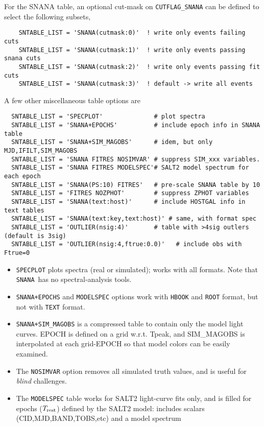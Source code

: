 \documentclass[12pt]{article}
\newcommand{\Trest}{T_{\rm rest}}
\newcommand{\snana}{{\tt SNANA}}
\begin{document}
{For the SNANA table, an optional cut-mask on {\tt CUTFLAG\_SNANA} can
be defined to select the following subsets,
\begin{verbatim}
    SNTABLE_LIST = 'SNANA(cutmask:0)'  ! write only events failing cuts
    SNTABLE_LIST = 'SNANA(cutmask:1)'  ! write only events passing snana cuts
    SNTABLE_LIST = 'SNANA(cutmask:2)'  ! write only events passing fit cuts
    SNTABLE_LIST = 'SNANA(cutmask:3)'  ! default -> write all events
\end{verbatim}


\clearpage
A few other miscellaneous table options are
%
\begin{verbatim}
  SNTABLE_LIST = 'SPECPLOT'              # plot spectra
  SNTABLE_LIST = 'SNANA+EPOCHS'          # include epoch info in SNANA table
  SNTABLE_LIST = 'SNANA+SIM_MAGOBS'      # idem, but only MJD,IFILT,SIM_MAGOBS
  SNTABLE_LIST = 'SNANA FITRES NOSIMVAR' # suppress SIM_xxx variables.
  SNTABLE_LIST = 'SNANA FITRES MODELSPEC'# SALT2 model spectrum for each epoch
  SNTABLE_LIST = 'SNANA(PS:10) FITRES'   # pre-scale SNANA table by 10
  SNTABLE_LIST = 'FITRES NOZPHOT'        # suppress ZPHOT variables
  SNTABLE_LIST = 'SNANA(text:host)'      # include HOSTGAL info in text tables
  SNTABLE_LIST = 'SNANA(text:key,text:host)' # same, with format spec
  SNTABLE_LIST = 'OUTLIER(nsig:4)'       # table with >4sig outlers (default is 3sig)
  SNTABLE_LIST = 'OUTLIER(nsig:4,ftrue:0.0)'   # include obs with Ftrue=0
\end{verbatim}
%
\begin{itemize}
  \item {\tt SPECPLOT} plots spectra (real or simulated); works with
     all formats. Note that \snana\ has no spectral-analysis tools.
%
\item {\tt SNANA+EPOCHS} and {\tt MODELSPEC} options work with 
{\tt HBOOK} and {\tt ROOT} format, but not with {\tt TEXT} format. 
%
\item {\tt SNANA+SIM\_MAGOBS} is a compressed table to contain
  only the model light curves. EPOCH is defined on a grid w.r.t. Tpeak,
  and SIM\_MAGOBS is interpolated at each grid-EPOCH so that model
  colors can be easily examined.
\item
The {\tt NOSIMVAR} option removes all simulated truth values, 
and is useful for {\it blind} challenges. 
%
\item
The {\tt MODELSPEC} table works for SALT2 light-curve fits only, 
and is filled for epochs ($\Trest$) defined by the SALT2 model: 
includes scalars (CID,MJD,BAND,TOBS,etc) and a model spectrum

\end{itemize}}
\end{document}
